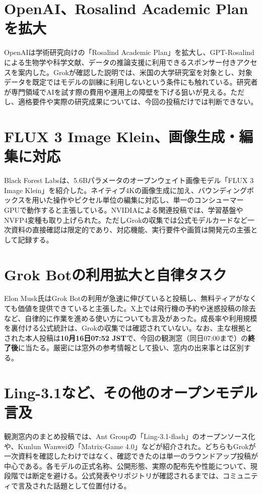 \section{OpenAI、Rosalind Academic Planを拡大}
OpenAIは学術研究向けの「Rosalind Academic Plan」を拡大し、GPT-Rosalindによる生物学や科学文献、データの推論支援に利用できるスポンサー付きアクセスを案内した。Grokが確認した説明では、米国の大学研究室を対象とし、対象データを既定ではモデルの訓練に利用しないという条件にも触れている。研究者が専門領域でAIを試す際の費用や運用上の障壁を下げる狙いが見える。ただし、適格要件や実際の研究成果については、今回の投稿だけでは判断できない。

\section{FLUX 3 Image Klein、画像生成・編集に対応}
Black Forest Labsは、5.6Bパラメータのオープンウェイト画像モデル「FLUX 3 Image Klein」を紹介した。ネイティブ4Kの画像生成に加え、バウンディングボックスを用いた操作やピクセル単位の編集に対応し、単一のコンシューマーGPUで動作すると主張している。NVIDIAによる関連投稿では、学習基盤やNVFP4変種も取り上げられた。ただしGrokの収集では公式モデルカードなど一次資料の直接確認は限定的であり、対応機能、実行要件や画質は開発元の主張として記録する。

\section{Grok Botの利用拡大と自律タスク}
Elon Musk氏はGrok Botの利用が急速に伸びていると投稿し、無料ティアがなくても価値を提供できていると主張した。X上では飛行機の予約や迷惑投稿の除去など、自律的に作業を進める使い方についても言及があった。成長率や利用規模を裏付ける公式統計は、Grokの収集では確認されていない。なお、主な根拠とされた本人投稿は\textbf{10月16日07:52 JST}で、今回の観測窓（同日07:00まで）の\textbf{終了後}に当たる。厳密には窓外の参考情報として扱い、窓内の出来事とは区別する。

\section{Ling-3.1など、その他のオープンモデル言及}
観測窓内のまとめ投稿では、Ant Groupの「Ling-3.1-flash」のオープンソース化や、Kunlun Wanweiの「Matrix-Game 4.0」などが紹介された。どちらもGrokが一次資料を確認したわけではなく、確認できたのは単一のラウンドアップ投稿が中心である。各モデルの正式名称、公開形態、実際の配布先や性能について、現段階では断定を避ける。公式発表やリポジトリが確認されるまでは、コミュニティで言及された話題として位置付ける。
